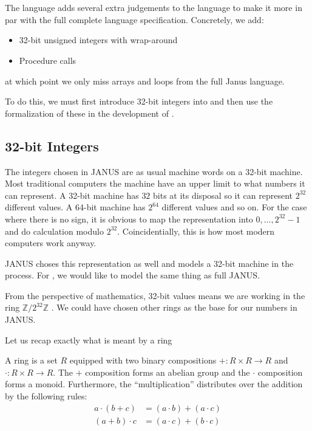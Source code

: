 \chapter{\januso{}}
\label{chap:janus1}

The \januso{} language adds several extra judgements to the \janusz{}
language to make it more in par with the full complete language
specification. Concretely, we add:
\begin{itemize}
\item 32-bit unsigned integers with wrap-around
\item Procedure calls
\end{itemize}
at which point we only miss arrays and loops from the full Janus
language.

To do this, we must first introduce 32-bit integers into \coq{} and
then use the formalization of these in the development of \januso{}.

\section{32-bit Integers}
\label{sec:32-bit-integers}

The integers chosen in JANUS are as usual machine words on a 32-bit
machine. Most traditional computers the machine have an upper limit
to what numbers it can represent. A 32-bit machine has $32$ bits at
its disposal so it can represent $2^{32}$ different values. A 64-bit
machine has $2^{64}$ different values and so on. For the case where
there is no sign, it is obvious to map the representation into $0,
\dotsc, 2^{32}-1$ and do calculation modulo $2^{32}$. Coincidentially,
this is how most modern computers work anyway.

JANUS choses this representation as well and models a 32-bit machine
in the process. For \januso{}, we would like to model the same thing
as full JANUS.

From the perspective of mathematics, 32-bit values means we are
working in the ring $\mathbb{Z}/2^{32}\mathbb{Z}$
\cite{c-u-jensen+2003:klassisk-algebra}.  We could have chosen other
rings as the base for our numbers in JANUS.

Let us recap exactly what is meant by a ring
\begin{defn}
  A ring is a set $R$ equipped with two binary compositions $+\colon R
  \times R \to R$ and $\cdot \colon R \times R \to R$. The $+$
  composition forms an abelian group and the $\cdot$ composition forms
  a monoid. Furthermore, the ``multiplication'' distributes over the
  addition by the following rules:
  \begin{align*}
    a \cdot (b + c) & = (a \cdot b) + (a \cdot c)\\
    (a + b) \cdot c & = (a \cdot c) + (b \cdot c)
  \end{align*}
\end{defn}

